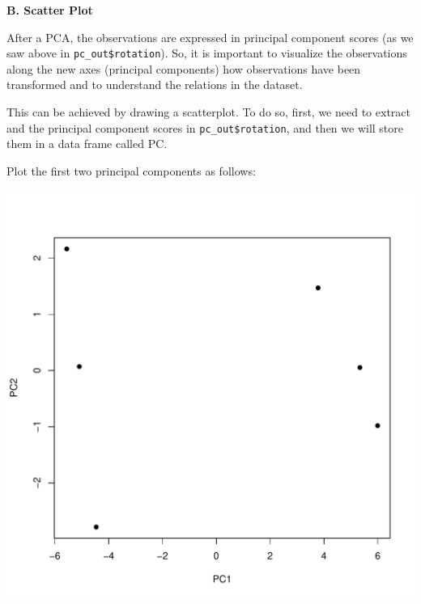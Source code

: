 \documentclass[
]{book}
\newenvironment{Shaded}{\begin{snugshade}}{\end{snugshade}}
\newcommand{\AttributeTok}[1]{\textcolor[rgb]{0.13,0.29,0.53}{#1}}
\newcommand{\DecValTok}[1]{\textcolor[rgb]{0.00,0.00,0.81}{#1}}
\newcommand{\FunctionTok}[1]{\textcolor[rgb]{0.13,0.29,0.53}{\textbf{#1}}}
\newcommand{\NormalTok}[1]{#1}
\newcommand{\OtherTok}[1]{\textcolor[rgb]{0.56,0.35,0.01}{#1}}
\newcommand{\SpecialCharTok}[1]{\textcolor[rgb]{0.81,0.36,0.00}{\textbf{#1}}}
\newcommand{\StringTok}[1]{\textcolor[rgb]{0.31,0.60,0.02}{#1}}
\begin{document}
\textbf{B. Scatter Plot}

After a PCA, the observations are expressed in principal component scores (as we saw above in \texttt{pc\_out\$rotation}). So, it is important to visualize the observations along the new axes (principal components) how observations have been transformed and to understand the relations in the dataset.

This can be achieved by drawing a scatterplot. To do so, first, we need to extract and the principal component scores in \texttt{pc\_out\$rotation}, and then we will store them in a data frame called PC.

\begin{Shaded}
\end{Shaded}

Plot the first two principal components as follows:

\begin{Shaded}
\end{Shaded}

\includegraphics{_main_files/figure-latex/unnamed-chunk-47-1.pdf}
\end{document}
